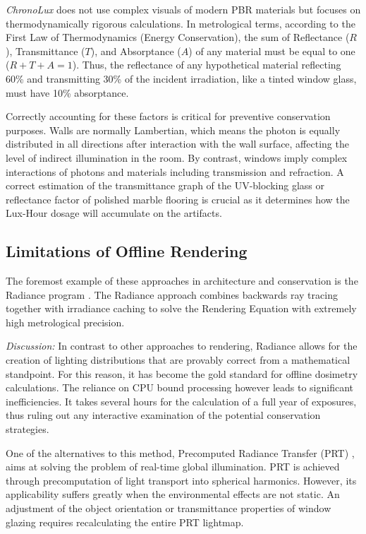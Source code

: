 \textit{ChronoLux} does not use complex visuals of modern PBR materials but focuses on thermodynamically rigorous calculations. In metrological terms, according to the First Law of Thermodynamics (Energy Conservation), the sum of Reflectance ($R$), Transmittance ($T$), and Absorptance ($A$) of any material must be equal to one ($R + T + A = 1$). Thus, the reflectance of any hypothetical material reflecting 60\% and transmitting 30\% of the incident irradiation, like a tinted window glass, must have 10\% absorptance.

Correctly accounting for these factors is critical for preventive conservation purposes. Walls are normally Lambertian, which means the photon is equally distributed in all directions after interaction with the wall surface, affecting the level of indirect illumination in the room. By contrast, windows imply complex interactions of photons and materials including transmission and refraction. A correct estimation of the transmittance graph of the UV-blocking glass or reflectance factor of polished marble flooring is crucial as it determines how the Lux-Hour dosage will accumulate on the artifacts.

\subsection{Limitations of Offline Rendering}
The foremost example of these approaches in architecture and conservation is the Radiance program \cite{ward1998rendering}. The Radiance approach combines backwards ray tracing together with irradiance caching to solve the Rendering Equation with extremely high metrological precision.

\textit{Discussion:} In contrast to other approaches to rendering, Radiance allows for the creation of lighting distributions that are provably correct from a mathematical standpoint. For this reason, it has become the gold standard for offline dosimetry calculations. The reliance on CPU bound processing however leads to significant inefficiencies. It takes several hours for the calculation of a full year of exposures, thus ruling out any interactive examination of the potential conservation strategies.

One of the alternatives to this method, Precomputed Radiance Transfer (PRT) \cite{sloan2002precomputed}, aims at solving the problem of real-time global illumination. PRT is achieved through precomputation of light transport into spherical harmonics. However, its applicability suffers greatly when the environmental effects are not static. An adjustment of the object orientation or transmittance properties of window glazing requires recalculating the entire PRT lightmap.

